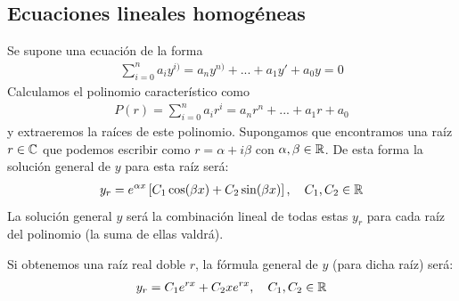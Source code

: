 \documentclass[12pt]{book}
\begin{document}
    \subsection{Ecuaciones lineales homogéneas}
    Se supone una ecuación de la forma 
    \begin{gather*}
        \sum_{i=0}^n a_i y^{i)} = a_ny^{n)} + ... + a_1 y' + a_0y = 0
    \end{gather*}
    Calculamos el polinomio característico como 
    \begin{gather*}
        P(r) = \sum_{i=0}^n a_i r^i = a_nr^n + ... + a_1r + a_0
    \end{gather*}
    y extraeremos la raíces de este polinomio. Supongamos que encontramos una raíz $r\in \mathbb{C}$ que podemos escribir como $r=\alpha + i\beta$ con $\alpha, \beta \in \mathbb{R}$. De esta forma la solución general de $y$ para esta raíz será:
    \begin{gather*}
        y_r = e^{\alpha x} \left[ C_1 \cos(\beta x) + C_2 \sin(\beta x) \right],\ \ \ C_1,C_2\in \mathbb{R}
    \end{gather*}
    La solución general $y$ será la combinación lineal de todas estas $y_r$ para cada raíz del polinomio (la suma de ellas valdrá).

    Si obtenemos una raíz real doble $r$, la fórmula general de $y$ (para dicha raíz) será:
    \begin{gather*}
        y_r = C_1 e^{rx} + C_2 x e^{rx}, \ \ \ C_1, C_2\in \mathbb{R}
    \end{gather*}
\end{document}

